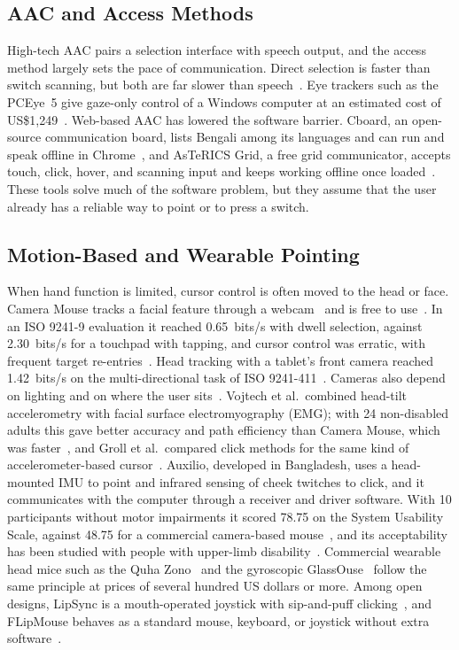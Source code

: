 \documentclass[journal]{IEEEtran}
\begin{document}
\subsection{AAC and Access Methods}
High-tech AAC pairs a selection interface with speech output, and the access method largely sets the pace of communication. Direct selection is faster than switch scanning, but both are far slower than speech~\cite{waller2025}. Eye trackers such as the PCEye~5 give gaze-only control of a Windows computer at an estimated cost of US\$1,249~\cite{montechpceye}. Web-based AAC has lowered the software barrier. Cboard, an open-source communication board, lists Bengali among its languages and can run and speak offline in Chrome~\cite{cboard}, and AsTeRICS Grid, a free grid communicator, accepts touch, click, hover, and scanning input and keeps working offline once loaded~\cite{astericsgrid}. These tools solve much of the software problem, but they assume that the user already has a reliable way to point or to press a switch.

\subsection{Motion-Based and Wearable Pointing}
When hand function is limited, cursor control is often moved to the head or face. Camera Mouse tracks a facial feature through a webcam~\cite{betke2002} and is free to use~\cite{vojtech2020}. In an ISO 9241-9 evaluation it reached 0.65~bits/s with dwell selection, against 2.30~bits/s for a touchpad with tapping, and cursor control was erratic, with frequent target re-entries~\cite{hassan2019}. Head tracking with a tablet's front camera reached 1.42~bits/s on the multi-directional task of ISO 9241-411~\cite{roigmaimo2018}. Cameras also depend on lighting and on where the user sits~\cite{kabir2026}. Vojtech et al.\ combined head-tilt accelerometry with facial surface electromyography (EMG); with 24 non-disabled adults this gave better accuracy and path efficiency than Camera Mouse, which was faster~\cite{vojtech2020}, and Groll et al.\ compared click methods for the same kind of accelerometer-based cursor~\cite{groll2020}. Auxilio, developed in Bangladesh, uses a head-mounted IMU to point and infrared sensing of cheek twitches to click, and it communicates with the computer through a receiver and driver software. With 10 participants without motor impairments it scored 78.75 on the System Usability Scale, against 48.75 for a commercial camera-based mouse~\cite{kabir2026}, and its acceptability has been studied with people with upper-limb disability~\cite{kabir2023}. Commercial wearable head mice such as the Quha Zono~\cite{montechquha} and the gyroscopic GlassOuse~\cite{glassouse} follow the same principle at prices of several hundred US dollars or more. Among open designs, LipSync is a mouth-operated joystick with sip-and-puff clicking~\cite{lipsync}, and FLipMouse behaves as a standard mouse, keyboard, or joystick without extra software~\cite{flipmouse}.
\end{document}

